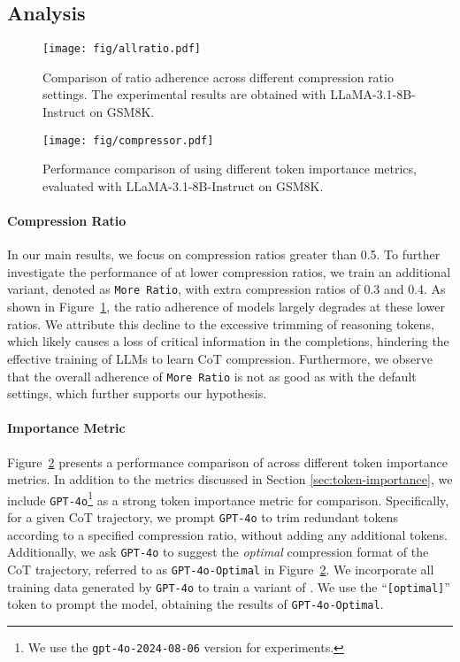 \subsection{Analysis}
\label{sec:analysis}
\begin{figure}[t]
\centering
    \texttt{[image: fig/allratio.pdf]}
    \caption{Comparison of ratio adherence across different compression ratio settings. The experimental results are obtained with LLaMA-3.1-8B-Instruct on GSM8K.}
    \label{fig:allratio}
\end{figure}

\begin{figure}[t]
\centering
    \texttt{[image: fig/compressor.pdf]}
    \caption{Performance comparison of \method using different token importance metrics, evaluated with LLaMA-3.1-8B-Instruct on GSM8K.}
    \label{fig:compressor}
\end{figure}

\paragraph{Compression Ratio} 
In our main results, we focus on compression ratios greater than 0.5. To further investigate the performance of \method at lower compression ratios, we train an additional variant, denoted as \texttt{More Ratio}, with extra compression ratios of 0.3 and 0.4. As shown in Figure~\ref{fig:allratio}, the ratio adherence of models largely degrades at these lower ratios. We attribute this decline to the excessive trimming of reasoning tokens, which likely causes a loss of critical information in the completions, hindering the effective training of LLMs to learn CoT compression. Furthermore, we observe that the overall adherence of \texttt{More Ratio} is not as good as \method with the default settings, which further supports our hypothesis.

\paragraph{Importance Metric} 
Figure~\ref{fig:compressor} presents a performance comparison of \method across different token importance metrics. In addition to the metrics discussed in Section \ref{sec:token-importance}, we include \texttt{GPT-4o}\footnote{We use the \texttt{gpt-4o-2024-08-06} version for experiments.} as a strong token importance metric for comparison. Specifically, for a given CoT trajectory, we prompt \texttt{GPT-4o} to trim redundant tokens according to a specified compression ratio, without adding any additional tokens. Additionally, we ask \texttt{GPT-4o} to suggest the \textit{optimal} compression format of the CoT trajectory, referred to as \texttt{GPT-4o-Optimal} in Figure~\ref{fig:compressor}. We incorporate all training data generated by \texttt{GPT-4o} to train a variant of \method. We use the ``\texttt{[optimal]}'' token to prompt the model, obtaining the results of \texttt{GPT-4o-Optimal}.

